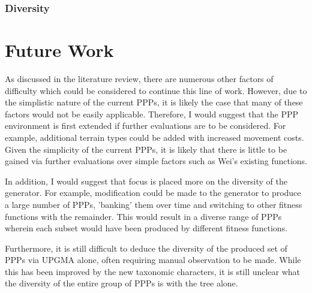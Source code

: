 \documentclass[authoryearcitations]{UoYCSproject}
\begin{document}
\subsection{Diversity}
\label{sec:conc_div}

\chapter{Future Work}
\label{cha:futWork}
As discussed in the literature review, there are numerous other factors of difficulty which could be considered to continue this line of work. However, due to the simplistic nature of the current PPPs, it is likely the case that many of these factors would not be easily applicable. Therefore, I would suggest that the PPP environment is first extended if further evaluations are to be considered. For example, additional terrain types could be added with increased movement costs. Given the simplicity of the current PPPs, it is likely that there is little to be gained via further evaluations over simple factors such as Wei's existing functions.

In addition, I would suggest that focus is placed more on the diversity of the generator. For example, modification could be made to the generator to produce a large number of PPPs, 'banking' them over time and switching to other fitness functions with the remainder. This would result in a diverse range of PPPs wherein each subset would have been produced by different fitness functions.

Furthermore, it is still difficult to deduce the diversity of the produced set of PPPs via UPGMA alone, often requiring manual observation to be made. While this has been improved by the new taxonomic characters, it is still unclear what the diversity of the entire group of PPPs is with the tree alone. 
\end{document}
